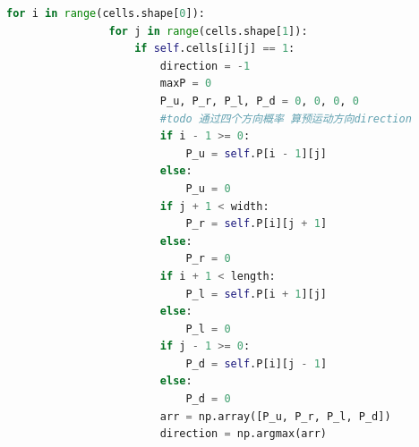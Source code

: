 \documentclass{mcmthesis}
\begin{document}
\begin{lstlisting}[language=Python]
            for i in range(cells.shape[0]):
                for j in range(cells.shape[1]):
                    if self.cells[i][j] == 1:
                        direction = -1
                        maxP = 0
                        P_u, P_r, P_l, P_d = 0, 0, 0, 0
                        #todo 通过四个方向概率 算预运动方向direction
                        if i - 1 >= 0:
                            P_u = self.P[i - 1][j]
                        else:
                            P_u = 0
                        if j + 1 < width:
                            P_r = self.P[i][j + 1]
                        else:
                            P_r = 0
                        if i + 1 < length:
                            P_l = self.P[i + 1][j]
                        else:
                            P_l = 0
                        if j - 1 >= 0:
                            P_d = self.P[i][j - 1]
                        else:
                            P_d = 0
                        arr = np.array([P_u, P_r, P_l, P_d])
                        direction = np.argmax(arr)
    

\end{lstlisting}
\end{document}
